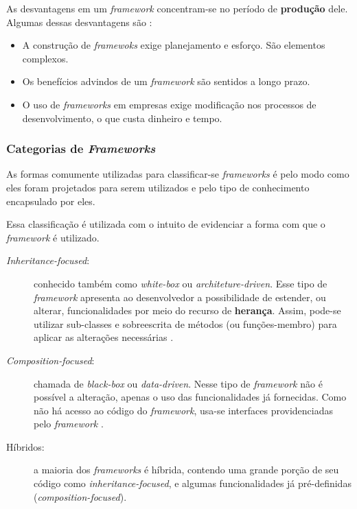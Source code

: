 As desvantagens em um \textit{framework} concentram-se no período de \textbf{produção} dele. Algumas dessas desvantagens são \cite{barretoJunior2006} \cite{sauve2006}:
\begin{itemize}
\item A construção de \textit{framewoks} exige planejamento e esforço. São elementos complexos.
\item Os benefícios advindos de um \textit{framework} são sentidos a longo prazo.
\item O uso de \textit{frameworks} em empresas exige modificação nos processos de desenvolvimento, o que custa dinheiro e tempo.
\end{itemize}
\par

\subsubsection{Categorias de \textit{Frameworks}}
As formas comumente utilizadas para classificar-se \textit{frameworks} é pelo modo como eles foram projetados para serem utilizados e pelo tipo de conhecimento encapsulado por eles.

Essa classificação é utilizada com o intuito de evidenciar a forma com que o \textit{framework} é utilizado.
\begin{description}
\item[\textit{Inheritance-focused}:] conhecido também como \textit{white-box} ou \textit{architeture-driven}. Esse tipo de \textit{framework} apresenta ao desenvolvedor a possibilidade de estender, ou alterar, funcionalidades por meio do recurso de \textbf{herança}. Assim, pode-se utilizar sub-classes e sobreescrita de métodos (ou funções-membro) para aplicar as alterações necessárias \cite{sauve2006}.
\item[\textit{Composition-focused}:] chamada de \textit{black-box} ou \textit{data-driven}. Nesse tipo de \textit{framework}  não é possível a alteração, apenas o uso das funcionalidades já fornecidas. Como não há acesso ao código do \textit{framework}, usa-se interfaces providenciadas pelo \textit{framework} \cite{sauve2006}.
\item[Híbridos:] a maioria dos \textit{frameworks} é híbrida, contendo uma grande porção de seu código como \textit{inheritance-focused}, e algumas funcionalidades já pré-definidas (\textit{composition-focused}).
\end{description}

